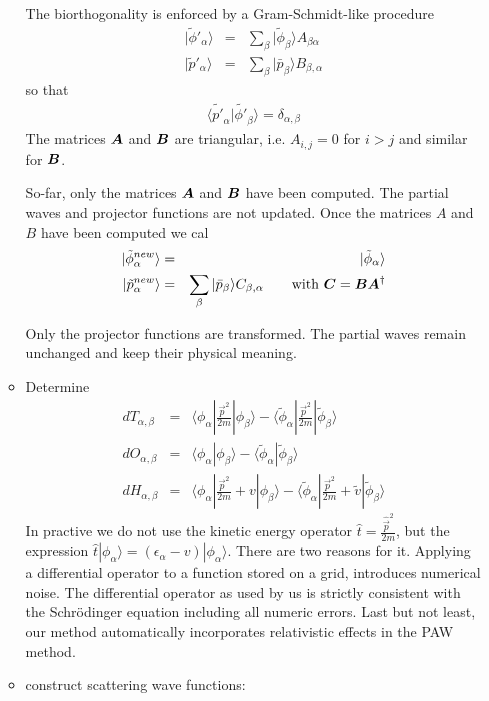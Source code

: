 \documentclass[11pt,a4paper]{report}
\begin{document}
\begin{enumerate}
\begin{itemize}
The biorthogonality is enforced by a Gram-Schmidt-like procedure
\begin{eqnarray*}
|\tilde{\phi}'_\alpha\rangle&=&\sum_\beta |\tilde{\phi}_\beta\rangle A_{\beta\alpha}
\\
|\tilde{p}'_\alpha\rangle&=&\sum_\beta |\bar{p}_\beta\rangle B_{\beta,\alpha}
\end{eqnarray*}
so that 
\begin{eqnarray*}
\langle\tilde{p'}_\alpha|\tilde{\phi'}_\beta\rangle=\delta_{\alpha,\beta}
\end{eqnarray*}
The matrices $\bm{A}$ and $\bm{B}$ are triangular, i.e. $A_{i,j}=0$
for $i>j$ and similar for $\bm{B}$.

So-far, only the matrices $\bm{A}$ and $\bm{B}$ have been computed. The partial waves and
projector functions are not updated.  
Once the matrices $A$ and $B$ have been computed we cal
\begin{eqnarray*}
|\tilde{\phi}^{new}_\alpha\rangle&=&|\tilde{\phi}_\alpha\rangle
\\
|\tilde{p}^{new}_\alpha\rangle&=&\sum_\beta |\bar{p}_\beta\rangle C_{\beta,\alpha}
\qquad\text{with $\bm{C}=\bm{B}\bm{A}^{\dagger}$}
\end{eqnarray*}


Only the projector functions are transformed. The partial waves remain
unchanged and keep their physical meaning.

\item Determine 
\begin{eqnarray*}
dT_{\alpha,\beta}&=&
\langle\phi_\alpha|\frac{\vec{p}^2}{2m}|\phi_\beta\rangle
-\langle\tilde{\phi}_\alpha|\frac{\vec{p}^2}{2m}|\tilde{\phi}_\beta\rangle
\\
dO_{\alpha,\beta}&=&
\langle\phi_\alpha|\phi_\beta\rangle
-\langle\tilde{\phi}_\alpha|\tilde{\phi}_\beta\rangle
\\
dH_{\alpha,\beta}&=&
\langle\phi_\alpha|\frac{\vec{p}^2}{2m}+v|\phi_\beta\rangle
-\langle\tilde{\phi}_\alpha|\frac{\vec{p}^2}{2m}+\tilde{v}|\tilde{\phi}_\beta\rangle
\end{eqnarray*}
In practive we do not use the kinetic energy operator
$\hat{t}=\frac{\hat{\vec{p}}^2}{2m}$, but the expression
$\hat{t}|\phi_\alpha
\rangle=(\epsilon_\alpha-v)|\phi_\alpha\rangle$. There are two reasons
for it. Applying a differential operator to a function stored on a
grid, introduces numerical noise. The differential operator as used by
us is strictly consistent with the Schr\"odinger equation including
all numeric errors. Last but not least, our method automatically
incorporates relativistic effects in the PAW method.
\item construct scattering wave functions:


\end{itemize}
\end{enumerate}
\end{document}
